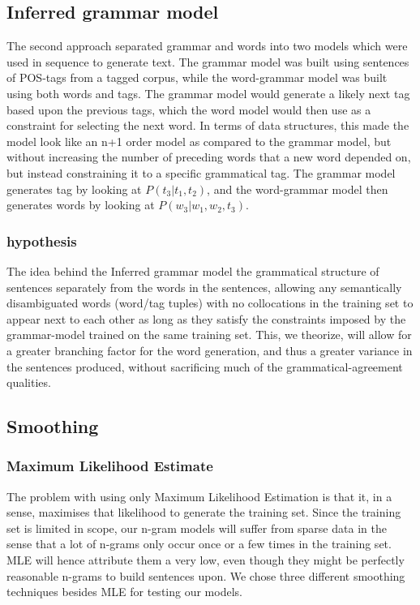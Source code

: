 \documentclass[a4paper,12pt]{article}
\begin{document}
\subsection{Inferred grammar model}
The second approach separated grammar and words into two models which were used in sequence to generate text. The grammar model was built using sentences of POS-tags from a tagged corpus, while the word-grammar model was built using both words and tags. The grammar model would generate a likely next tag based upon the previous tags, which the word model would then use as a constraint for selecting the next word. In terms of data structures, this made the model look like an n+1 order model as compared to the grammar model, but without increasing the number of preceding words that a new word depended on, but instead constraining it to a specific grammatical tag.
The grammar model generates tag by looking at $P(t_3|t_1,t_2)$, and the word-grammar model then generates words by looking at $P(w_3|w_1,w_2,t_3)$.

\subsubsection{hypothesis}
The idea behind the Inferred grammar model the grammatical structure of sentences separately from the words in the sentences, allowing any semantically disambiguated words (word/tag tuples) with no collocations in the training set to appear next to each other as long as they satisfy the constraints imposed by the grammar-model trained on the same training set. This, we theorize, will allow for a greater branching factor for the word generation, and thus a greater variance in the sentences produced, without sacrificing much of the grammatical-agreement qualities.

\subsection{Smoothing}


\subsubsection{Maximum Likelihood Estimate}
The problem with using only Maximum Likelihood Estimation is that it, in a sense, maximises that likelihood to generate the training set. Since the training set is limited in scope, our n-gram models will suffer from sparse data in the sense that a lot of n-grams only occur once or a few times in the training set. MLE will hence attribute them a very low, even though they might be perfectly reasonable n-grams to build sentences upon. We chose three different smoothing techniques besides MLE for testing our models.
\end{document}
